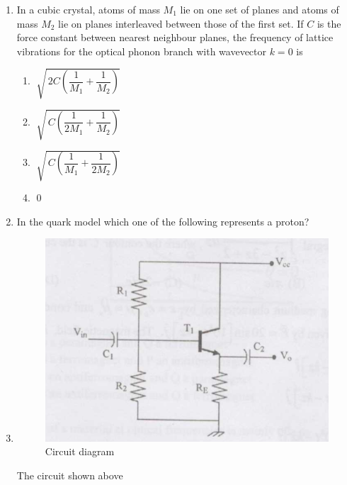 \documentclass[14pt, a4paper]{extarticle}
\begin{document}
\begin{enumerate}[label=\textbf{Q. \arabic*}]
\item In a cubic crystal, atoms of mass $M_1$ lie on one set of planes and atoms of mass $M_2$ lie on planes interleaved between those of the first set. If $C$ is the force constant between nearest neighbour planes, the frequency of lattice vibrations for the optical phonon branch with wavevector $k=0$ is
\begin{enumerate}
\item$\; \sqrt{\,2C \left(\dfrac{1}{M_1} + \dfrac{1}{M_2}\right)}$
\item$\; \sqrt{\,C \left(\dfrac{1}{2M_1} + \dfrac{1}{M_2}\right)}$
\item$\; \sqrt{\,C \left(\dfrac{1}{M_1} + \dfrac{1}{2M_2}\right)}$
\item$\; 0$
\end{enumerate}

\item In the quark model which one of the following represents a proton?
    \begin{enumerate}
    \end{enumerate}

\item

\begin{figure}[H]
\centering
\includegraphics[width=0.6\columnwidth]{figs/Q19fig.png}
\caption{Circuit diagram}
\label{fig:q17}
\end{figure}

The circuit shown above
\begin{enumerate}
\end{enumerate}


\end{enumerate}
\end{document}
